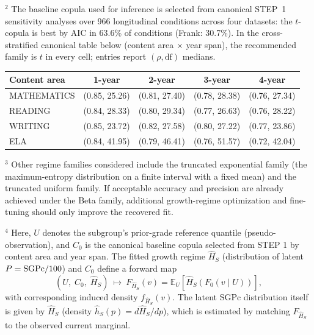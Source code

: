 \documentclass[10pt]{article}
\begin{document}
\noindent
\hspace{0.25in}%
\begin{minipage}[t]{7.55in}
{\footnotesize%
$^{2}$ The baseline copula used for inference is selected from canonical STEP~1 sensitivity analyses
over 966 longitudinal conditions across four datasets: the $t$-copula is best by AIC in
63.6\% of conditions (Frank: 30.7\%). In the cross-stratified canonical table below
(content area $\times$ year span), the recommended family is $t$ in every cell; entries
report $(\rho,\mathrm{df})$ medians.

\vspace{2pt}
\begin{center}
\begin{tabular}{@{}lcccc@{}}
\textbf{Content area} & \textbf{1-year} & \textbf{2-year} & \textbf{3-year} & \textbf{4-year} \\
\hline
\noalign{\vspace{2pt}}
MATHEMATICS & (0.85, 25.26) & (0.81, 27.40) & (0.78, 28.38) & (0.76, 27.34) \\
READING     & (0.84, 28.33) & (0.80, 29.34) & (0.77, 26.63) & (0.76, 28.22) \\
WRITING     & (0.85, 23.72) & (0.82, 27.58) & (0.80, 27.22) & (0.77, 23.86) \\
ELA         & (0.84, 41.95) & (0.79, 46.41) & (0.76, 51.57) & (0.72, 42.04) \\
\end{tabular}
\end{center}

\vspace{6pt}
$^{3}$ Other regime families considered include the truncated exponential family
(the maximum-entropy distribution on a finite interval with a fixed mean) and the
truncated uniform family. If acceptable accuracy and precision are already achieved
under the Beta family, additional growth-regime optimization and fine-tuning should
only improve the recovered fit.

\vspace{4pt}
$^{4}$ Here, $U$ denotes the subgroup’s prior-grade reference quantile (pseudo-observation), 
and $C_0$ is the canonical baseline copula selected from STEP 1 by content area and year span. 
The fitted growth regime $\widehat{H}_S$ (distribution of latent $P=\mathrm{SGPc}/100$) and $C_0$ 
define a forward map \[ (U,\;C_0,\;\widehat{H}_S)\ \longmapsto\ F_{\widehat{H}_S}(v)=\mathbb{E}_U\!\left[\widehat{H}_S\!\left(F_0(v\mid U)\right)\right], \] 
with corresponding induced density $f_{\widehat{H}_S}(v)$. The latent SGPc distribution itself 
is given by $\widehat{H}_S$ (density $\widehat{h}_S(p)=d\widehat{H}_S/dp$), which is estimated 
by matching $F_{\widehat{H}_S}$ to the observed current marginal.

}
\end{minipage}
\end{document}
